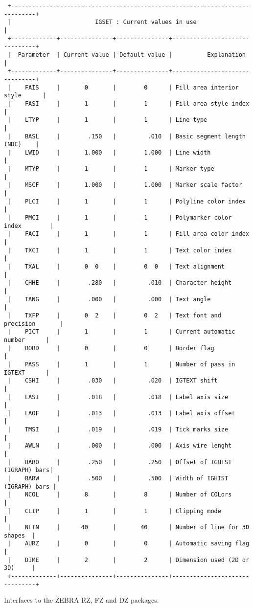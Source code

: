 \begin{verbatim}
 +-----------------------------------------------------------------------------+
 |                        IGSET : Current values in use                        |
 +-------------+---------------+---------------+-------------------------------+
 |  Parameter  | Current value | Default value |          Explanation          |
 +-------------+---------------+---------------+-------------------------------+
 |    FAIS     |       0       |        0      | Fill area interior style      |
 |    FASI     |       1       |        1      | Fill area style index         |
 |    LTYP     |       1       |        1      | Line type                     |
 |    BASL     |        .150   |         .010  | Basic segment length (NDC)    |
 |    LWID     |       1.000   |        1.000  | Line width                    |
 |    MTYP     |       1       |        1      | Marker type                   |
 |    MSCF     |       1.000   |        1.000  | Marker scale factor           |
 |    PLCI     |       1       |        1      | Polyline color index          |
 |    PMCI     |       1       |        1      | Polymarker color index        |
 |    FACI     |       1       |        1      | Fill area color index         |
 |    TXCI     |       1       |        1      | Text color index              |
 |    TXAL     |       0  0    |        0  0   | Text alignment                |
 |    CHHE     |        .280   |         .010  | Character height              |
 |    TANG     |        .000   |         .000  | Text angle                    |
 |    TXFP     |       0  2    |        0  2   | Text font and precision       |
 |    PICT     |       1       |        1      | Current automatic number      |
 |    BORD     |       0       |        0      | Border flag                   |
 |    PASS     |       1       |        1      | Number of pass in IGTEXT      |
 |    CSHI     |        .030   |         .020  | IGTEXT shift                  |
 |    LASI     |        .018   |         .018  | Label axis size               |
 |    LAOF     |        .013   |         .013  | Label axis offset             |
 |    TMSI     |        .019   |         .019  | Tick marks size               |
 |    AWLN     |        .000   |         .000  | Axis wire lenght              |
 |    BARO     |        .250   |         .250  | Offset of IGHIST (IGRAPH) bars|
 |    BARW     |        .500   |         .500  | Width of IGHIST (IGRAPH) bars |
 |    NCOL     |       8       |        8      | Number of COLors              |
 |    CLIP     |       1       |        1      | Clipping mode                 |
 |    NLIN     |      40       |       40      | Number of line for 3D shapes  |
 |    AURZ     |       0       |        0      | Automatic saving flag         |
 |    DIME     |       2       |        2      | Dimension used (2D or 3D)     |
 +-------------+---------------+---------------+-------------------------------+
\end{verbatim}
\ENDCMD
{}
\ifMENUtext
   \par
Interfaces to the ZEBRA RZ, FZ and DZ packages.  


